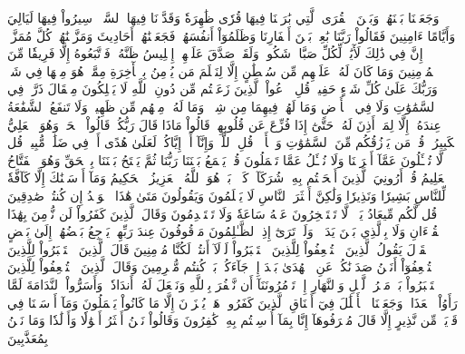 وَجَعَلۡنَا بَيۡنَهُمۡ وَبَيۡنَ ٱلۡقُرَى ٱلَّتِي بَٰرَكۡنَا فِيهَا قُرٗى ظَٰهِرَةٗ وَقَدَّرۡنَا فِيهَا ٱلسَّيۡرَۖ سِيرُواْ فِيهَا لَيَالِيَ وَأَيَّامًا ءَامِنِينَ
فَقَالُواْ رَبَّنَا بَٰعِدۡ بَيۡنَ أَسۡفَارِنَا وَظَلَمُوٓاْ أَنفُسَهُمۡ فَجَعَلۡنَٰهُمۡ أَحَادِيثَ وَمَزَّقۡنَٰهُمۡ كُلَّ مُمَزَّقٍۚ إِنَّ فِي ذَٰلِكَ لَأٓيَٰتٖ لِّكُلِّ صَبَّارٖ شَكُورٖ
وَلَقَدۡ صَدَّقَ عَلَيۡهِمۡ إِبۡلِيسُ ظَنَّهُۥ فَٱتَّبَعُوهُ إِلَّا فَرِيقٗا مِّنَ ٱلۡمُؤۡمِنِينَ
وَمَا كَانَ لَهُۥ عَلَيۡهِم مِّن سُلۡطَٰنٍ إِلَّا لِنَعۡلَمَ مَن يُؤۡمِنُ بِٱلۡأٓخِرَةِ مِمَّنۡ هُوَ مِنۡهَا فِي شَكّٖۗ وَرَبُّكَ عَلَىٰ كُلِّ شَيۡءٍ حَفِيظٞ
قُلِ ٱدۡعُواْ ٱلَّذِينَ زَعَمۡتُم مِّن دُونِ ٱللَّهِ لَا يَمۡلِكُونَ مِثۡقَالَ ذَرَّةٖ فِي ٱلسَّمَٰوَٰتِ وَلَا فِي ٱلۡأَرۡضِ وَمَا لَهُمۡ فِيهِمَا مِن شِرۡكٖ وَمَا لَهُۥ مِنۡهُم مِّن ظَهِيرٖ
وَلَا تَنفَعُ ٱلشَّفَٰعَةُ عِندَهُۥٓ إِلَّا لِمَنۡ أَذِنَ لَهُۥۚ حَتَّىٰٓ إِذَا فُزِّعَ عَن قُلُوبِهِمۡ قَالُواْ مَاذَا قَالَ رَبُّكُمۡۖ قَالُواْ ٱلۡحَقَّۖ وَهُوَ ٱلۡعَلِيُّ ٱلۡكَبِيرُ
۞قُلۡ مَن يَرۡزُقُكُم مِّنَ ٱلسَّمَٰوَٰتِ وَٱلۡأَرۡضِۖ قُلِ ٱللَّهُۖ وَإِنَّآ أَوۡ إِيَّاكُمۡ لَعَلَىٰ هُدًى أَوۡ فِي ضَلَٰلٖ مُّبِينٖ
قُل لَّا تُسۡـَٔلُونَ عَمَّآ أَجۡرَمۡنَا وَلَا نُسۡـَٔلُ عَمَّا تَعۡمَلُونَ
قُلۡ يَجۡمَعُ بَيۡنَنَا رَبُّنَا ثُمَّ يَفۡتَحُ بَيۡنَنَا بِٱلۡحَقِّ وَهُوَ ٱلۡفَتَّاحُ ٱلۡعَلِيمُ
قُلۡ أَرُونِيَ ٱلَّذِينَ أَلۡحَقۡتُم بِهِۦ شُرَكَآءَۖ كَلَّاۚ بَلۡ هُوَ ٱللَّهُ ٱلۡعَزِيزُ ٱلۡحَكِيمُ
وَمَآ أَرۡسَلۡنَٰكَ إِلَّا كَآفَّةٗ لِّلنَّاسِ بَشِيرٗا وَنَذِيرٗا وَلَٰكِنَّ أَكۡثَرَ ٱلنَّاسِ لَا يَعۡلَمُونَ
وَيَقُولُونَ مَتَىٰ هَٰذَا ٱلۡوَعۡدُ إِن كُنتُمۡ صَٰدِقِينَ
قُل لَّكُم مِّيعَادُ يَوۡمٖ لَّا تَسۡتَـٔۡخِرُونَ عَنۡهُ سَاعَةٗ وَلَا تَسۡتَقۡدِمُونَ
وَقَالَ ٱلَّذِينَ كَفَرُواْ لَن نُّؤۡمِنَ بِهَٰذَا ٱلۡقُرۡءَانِ وَلَا بِٱلَّذِي بَيۡنَ يَدَيۡهِۗ وَلَوۡ تَرَىٰٓ إِذِ ٱلظَّـٰلِمُونَ مَوۡقُوفُونَ عِندَ رَبِّهِمۡ يَرۡجِعُ بَعۡضُهُمۡ إِلَىٰ بَعۡضٍ ٱلۡقَوۡلَ يَقُولُ ٱلَّذِينَ ٱسۡتُضۡعِفُواْ لِلَّذِينَ ٱسۡتَكۡبَرُواْ لَوۡلَآ أَنتُمۡ لَكُنَّا مُؤۡمِنِينَ
قَالَ ٱلَّذِينَ ٱسۡتَكۡبَرُواْ لِلَّذِينَ ٱسۡتُضۡعِفُوٓاْ أَنَحۡنُ صَدَدۡنَٰكُمۡ عَنِ ٱلۡهُدَىٰ بَعۡدَ إِذۡ جَآءَكُمۖ بَلۡ كُنتُم مُّجۡرِمِينَ
وَقَالَ ٱلَّذِينَ ٱسۡتُضۡعِفُواْ لِلَّذِينَ ٱسۡتَكۡبَرُواْ بَلۡ مَكۡرُ ٱلَّيۡلِ وَٱلنَّهَارِ إِذۡ تَأۡمُرُونَنَآ أَن نَّكۡفُرَ بِٱللَّهِ وَنَجۡعَلَ لَهُۥٓ أَندَادٗاۚ وَأَسَرُّواْ ٱلنَّدَامَةَ لَمَّا رَأَوُاْ ٱلۡعَذَابَۚ وَجَعَلۡنَا ٱلۡأَغۡلَٰلَ فِيٓ أَعۡنَاقِ ٱلَّذِينَ كَفَرُواْۖ هَلۡ يُجۡزَوۡنَ إِلَّا مَا كَانُواْ يَعۡمَلُونَ
وَمَآ أَرۡسَلۡنَا فِي قَرۡيَةٖ مِّن نَّذِيرٍ إِلَّا قَالَ مُتۡرَفُوهَآ إِنَّا بِمَآ أُرۡسِلۡتُم بِهِۦ كَٰفِرُونَ
وَقَالُواْ نَحۡنُ أَكۡثَرُ أَمۡوَٰلٗا وَأَوۡلَٰدٗا وَمَا نَحۡنُ بِمُعَذَّبِينَ
